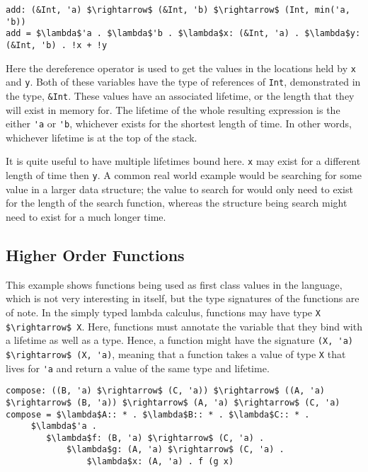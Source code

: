 \begin{lstlisting}[mathescape, caption={Addition of two references}, label={lst:add}]
add: (&Int, 'a) $\rightarrow$ (&Int, 'b) $\rightarrow$ (Int, min('a, 'b))
add = $\lambda$'a . $\lambda$'b . $\lambda$x: (&Int, 'a) . $\lambda$y: (&Int, 'b) . !x + !y
\end{lstlisting}

Here the dereference operator is used to get the values in the locations held
by \lstinline{x} and \lstinline{y}. Both of these variables have the type of
references of \lstinline{Int}, demonstrated in the type, \lstinline{&Int}.
These values have an associated lifetime, or the length that they will exist in
memory for. The lifetime of the whole resulting expression is the either
\lstinline{'a} or \lstinline{'b}, whichever exists for the shortest length of
time. In other words, whichever lifetime is at the top of the stack. 

It is quite useful to have multiple lifetimes bound here. \lstinline{x} may exist
for a different length of time then \lstinline{y}. A common real world example
would be searching for some value in a larger data structure; the value to
search for would only need to exist for the length of the search function, whereas the
structure being search might need to exist for a much longer time.

\subsection{Higher Order Functions}
This example shows functions being used as first class values in the language,
which is not very interesting in itself, but the type signatures of the
functions are of note. In the simply typed lambda calculus, functions may have type
\lstinline[mathescape]{X $\rightarrow$ X}. Here, functions must annotate the
variable that they bind with a lifetime as well as a type. Hence, a function
might have the signature \lstinline[mathescape]{(X, 'a) $\rightarrow$ (X, 'a)},
meaning that a function takes a value of type \lstinline{X} that lives for
\lstinline{'a} and return a value of the same type and lifetime. 

\begin{lstlisting}[mathescape, caption={Function composition}, label={lst:compose}]
compose: ((B, 'a) $\rightarrow$ (C, 'a)) $\rightarrow$ ((A, 'a) $\rightarrow$ (B, 'a)) $\rightarrow$ (A, 'a) $\rightarrow$ (C, 'a)
compose = $\lambda$A:: * . $\lambda$B:: * . $\lambda$C:: * .
     $\lambda$'a .
        $\lambda$f: (B, 'a) $\rightarrow$ (C, 'a) .
            $\lambda$g: (A, 'a) $\rightarrow$ (C, 'a) .
                $\lambda$x: (A, 'a) . f (g x)
\end{lstlisting}


